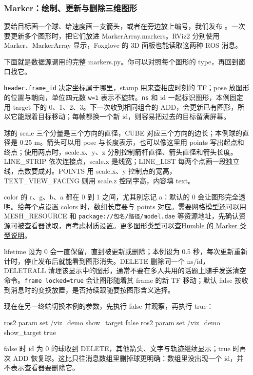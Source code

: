 \subsubsection{Marker：绘制、更新与删除三维图形}
要给目标画一个球、给速度画一支箭头，或者在旁边放上编号，我们发布 。一次要更新多个图形时，把它们放进 MarkerArray.markers。RViz2 分别使用 Marker、MarkerArray 显示，Foxglove 的 3D 面板也能读取这两种 ROS 消息。

\begin{example}[球、箭头、轨迹和文字共用一份目标位置]
下面就是数据源调用的完整 markers.py。你可以对照每个图形的 type，再回到窗口找它。


\texttt{header.frame\_id} 决定坐标属于哪里，stamp 用来查相应时刻的 TF；pose 放图形的位置与朝向，单位四元数 \texttt{w=1} 表示不旋转。\texttt{ns} 和 id 一起标识图形，本例固定用 target 下的 0、1、2、3。下一次收到相同组合的 ADD，会更新已有图形，所以它能跟着目标移动；每帧都换一个新 id，则容易把过去的目标留满屏幕。

球的 scale 三个分量是三个方向的直径，CUBE 对应三个方向的边长；本例球的直径是 0.25 m。箭头可以用 pose 与长度表示，也可以像这里用 points 写出起点和终点；使用两点时，scale.x、y、z 分别控制箭杆直径、箭头直径和箭头长度。LINE\_STRIP 依次连接点，scale.x 是线宽；LINE\_LIST 每两个点画一段独立线，点数要成对。POINTS 用 scale.x、y 控制点的宽高，TEXT\_VIEW\_FACING 则用 scale.z 控制字高，内容填 text。

color 的 r、g、b、a 都在 0 到 1 之间，尤其别忘记 a：默认的 0 会让图形完全透明。给每个点设置 colors 时，数组长度要与 points 对应。需要网格模型还可以用 MESH\_RESOURCE 和 \texttt{package://包名/路径/model.dae} 等资源地址，先确认资源可被查看器读取，再考虑材质设置。更多图形类型可以查\href{https://github.com/ros2/ros2_documentation/blob/humble/source/Tutorials/Intermediate/RViz/Marker-Display-types/Marker-Display-types.rst}{Humble 的 Marker 类型说明}。

lifetime 设为 0 会一直保留，直到被更新或删除；本例设为 0.5 秒，每次更新重新计时，停止发布后就能看到图形消失。DELETE 删除同一个 ns/id，DELETEALL 清理该显示中的图形，通常不要在多人共用的话题上随手发送清空命令。\texttt{frame\_locked=true} 会让图形随着其 frame 的新 TF 移动；默认 false 按收到消息时的变换放置，是否持续跟随要按图形含义选择。

现在在另一终端切换本例的参数，先执行 false 并观察，再执行 true：
\par\medskip\noindent\begin{minipage}{\linewidth}
\begin{tbash}
ros2 param set /viz_demo show_target false
ros2 param set /viz_demo show_target true
\end{tbash}
\end{minipage}\par\smallskip
false 时 id 为 0 的球收到 DELETE，其他箭头、文字与轨迹继续显示；true 时再次 ADD 恢复球。这比只往消息数组里删掉球更明确：数组里没出现一个 id，并不表示查看器要删除它。
\end{example}

